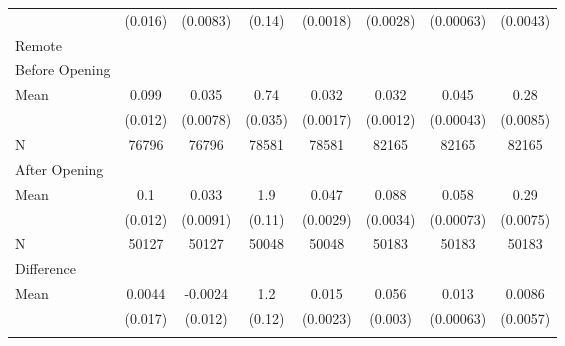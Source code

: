 \begin{tabular}{@{\extracolsep{5pt}}lccccccc}
   & (0.016) & (0.0083) & (0.14) & (0.0018) & (0.0028) & (0.00063) & (0.0043) \\
 Remote \\
 \qquad Before Opening \\
\qquad\quad Mean & 0.099 & 0.035 & 0.74 & 0.032 & 0.032 & 0.045 & 0.28 \\
   & (0.012) & (0.0078) & (0.035) & (0.0017) & (0.0012) & (0.00043) & (0.0085) \\
 \qquad\quad N & 76796 & 76796 & 78581 & 78581 & 82165 & 82165 & 82165 \\
\qquad After Opening \\
\qquad\quad Mean & 0.1 & 0.033 & 1.9 & 0.047 & 0.088 & 0.058 & 0.29 \\
   & (0.012) & (0.0091) & (0.11) & (0.0029) & (0.0034) & (0.00073) & (0.0075) \\
 \qquad\quad N & 50127 & 50127 & 50048 & 50048 & 50183 & 50183 & 50183 \\
\qquad Difference \\
\qquad\quad Mean & 0.0044 & -0.0024 & 1.2 & 0.015 & 0.056 & 0.013 & 0.0086 \\
   & (0.017) & (0.012) & (0.12) & (0.0023) & (0.003) & (0.00063) & (0.0057) \\

  \hline \\[-1.8ex]
\end{tabular}
